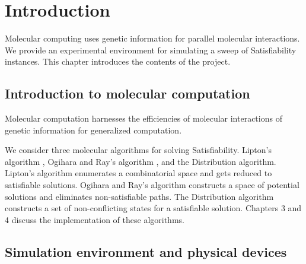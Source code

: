 \chapter{Introduction}


Molecular computing uses genetic information for parallel molecular interactions.  We provide an experimental environment for simulating a sweep of {\sc Satisfiability} instances.  This chapter introduces the contents of the project.

\section{Introduction to molecular computation}
	
				
Molecular computation harnesses the efficiencies of molecular interactions of genetic information for generalized computation.  %


	We consider three molecular algorithms for solving {\sc Satisfiability}.  Lipton's algorithm \cite{Lipton95usingdna}, Ogihara and Ray's algorithm \cite{Ogihara:1996:BFS:898228, Ogihara97dna-basedparallel}, and the Distribution algorithm.  Lipton's algorithm enumerates a combinatorial space and gets reduced to satisfiable solutions.  Ogihara and Ray's algorithm constructs a space of potential solutions and eliminates non-satisfiable paths.  The Distribution algorithm constructs a set of non-conflicting states for a satisfiable solution.  Chapters 3 and 4 discuss the implementation of these algorithms.
				
\section{Simulation environment and physical devices}
	
